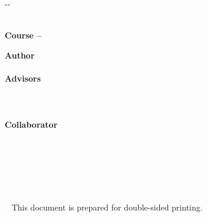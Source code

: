 {\begin{changemargin}{-\leftShift}{-\rightShift}
\vfill

\setcounter{lastyear}{\the\year}
\addtocounter{lastyear}{-1}

\begin{center}
  {\Large \textbf{\documentType}}\\
  {\Large \textbf{Course \thelastyear--\the\year}}
  
\end{center}

\vfill

\begin{large}
\begin{center}
{\Large \bfseries Author}\\
\textbf{\coverAuthor}\\[0.5cm]
{\Large \bfseries Advisors}\\
\textbf{\coverAdvisor}\\[0.5cm]
\ifx\coverCollaborator\undefined
\mbox{ } \\ \mbox{ } \\
\else
{\Large \bfseries Collaborator}\\
\textbf{\coverCollaborator}\\[0.5cm]
\fi
\textbf{\institution}\\[1em]
\end{center}
\end{large}

\vfill

\end{changemargin}

\newpage

\thispagestyle{empty}
\mbox{ }
\vfill%
\begin{small} 
\begin{center}
\mbox{ }
\end{center}
\end{small}
\vspace*{2cm}
\begin{small} 
\begin{center}
\ifx\doubleSidedExplanation\undefined
\mbox{ }
\else
\noindent This document is prepared for double-sided printing.
\fi
\end{center}
\end{small}


\newpage

}
